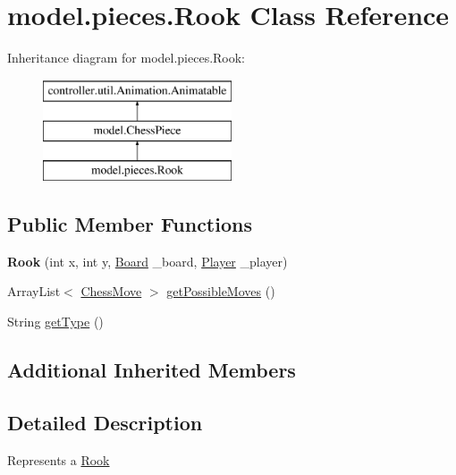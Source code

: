 \hypertarget{classmodel_1_1pieces_1_1_rook}{\section{model.\-pieces.\-Rook Class Reference}
\label{classmodel_1_1pieces_1_1_rook}
}
Inheritance diagram for model.\-pieces.\-Rook\-:\begin{figure}[H]
\begin{center}
\leavevmode
\includegraphics[height=3.000000cm]{classmodel_1_1pieces_1_1_rook}
\end{center}
\end{figure}
\subsection*{Public Member Functions}
\begin{DoxyCompactItemize}
\item 
\hypertarget{classmodel_1_1pieces_1_1_rook_a68e710f46abbb010f7c260a0336143b5}{{\bfseries Rook} (int x, int y, \hyperlink{classmodel_1_1board_1_1_board}{Board} \-\_\-board, \hyperlink{classcontroller_1_1_player}{Player} \-\_\-player)}\label{classmodel_1_1pieces_1_1_rook_a68e710f46abbb010f7c260a0336143b5}

\item 
Array\-List$<$ \hyperlink{classmodel_1_1_chess_move}{Chess\-Move} $>$ \hyperlink{classmodel_1_1pieces_1_1_rook_acdc88fcdbb81116be30b7f8c8c39e735}{get\-Possible\-Moves} ()
\item 
String \hyperlink{classmodel_1_1pieces_1_1_rook_a4ff4e4b36a743af9b64de9b53a9e1535}{get\-Type} ()
\end{DoxyCompactItemize}
\subsection*{Additional Inherited Members}


\subsection{Detailed Description}
Represents a \hyperlink{classmodel_1_1pieces_1_1_rook}{Rook}

